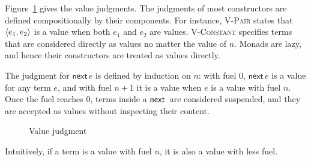 Figure~\ref{def:values} gives the value judgments. The judgments of most constructors are defined compositionally by their components. 
For instance, \textsc{V-Pair} states that $\langle e_1, e_2\rangle$ is a value when both $e_1$ and $e_2$ are values. \textsc{V-Constant} specifies terms that are considered directly as values no matter the value of $n$.
Monads are lazy, and hence their constructors are treated as values directly.

The judgment for $\mathsf{next}\,e$ is defined by induction on $n$: with fuel $0$,
$\mathsf{next}\,e$ is a value for any term $e$, and with fuel $n+1$
it is a value when $e$ is a value with fuel $n$. Once the fuel reaches
$0$, terms inside a $\mathsf{next}\,$ are considered suspended, and they are accepted as values without inspecting their content.

\begin{figure}[!htbp]
  \small
  \caption{Value judgment}
  \label{def:values}
\end{figure}

Intuitively, if a term is a value with fuel $n$, it is also a value with less fuel.

